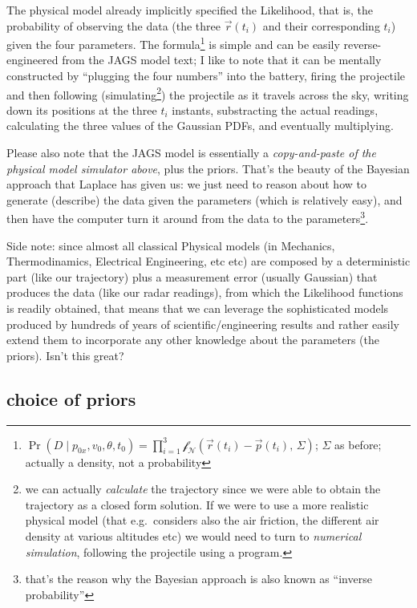\documentclass[]{article}
\begin{document}
The physical model already implicitly specified the Likelihood, that is,
the probability of observing the data (the three
\(\overrightarrow{r}(t_i)\) and their corresponding \(t_i\)) given the
four parameters. The formula\footnote{\(\Pr( D \mid p_{0x}, v_0, \theta, t_0 ) = \prod_{i=1}^{3} \mathcal{f_N}(\overrightarrow{r}(t_i) - \overrightarrow{p}(t_i),\,\Sigma)\);
  \(\Sigma\) as before; actually a density, not a probability} is simple
and can be easily reverse-engineered from the JAGS model text; I like to
note that it can be mentally constructed by ``plugging the four
numbers'' into the battery, firing the projectile and then following
(simulating\footnote{we can actually \emph{calculate} the trajectory
  since we were able to obtain the trajectory as a closed form solution.
  If we were to use a more realistic physical model (that e.g.~considers
  also the air friction, the different air density at various altitudes
  etc) we would need to turn to \emph{numerical simulation}, following
  the projectile using a program.}) the projectile as it travels across
the sky, writing down its positions at the three \(t_i\) instants,
substracting the actual readings, calculating the three values of the
Gaussian PDFs, and eventually multiplying.

Please also note that the JAGS model is essentially a
\emph{copy-and-paste of the physical model simulator above}, plus the
priors. That's the beauty of the Bayesian approach that Laplace has
given us: we just need to reason about how to generate (describe) the
data given the parameters (which is relatively easy), and then have the
computer turn it around from the data to the parameters\footnote{that's
  the reason why the Bayesian approach is also known as ``inverse
  probability''}.

Side note: since almost all classical Physical models (in Mechanics,
Thermodinamics, Electrical Engineering, etc etc) are composed by a
deterministic part (like our trajectory) plus a measurement error
(usually Gaussian) that produces the data (like our radar readings),
from which the Likelihood functions is readily obtained, that means that
we can leverage the sophisticated models produced by hundreds of years
of scientific/engineering results and rather easily extend them to
incorporate any other knowledge about the parameters (the priors). Isn't
this great?

\hypertarget{choice-of-priors}{%
\subsection{choice of priors}\label{choice-of-priors}}
\end{document}
